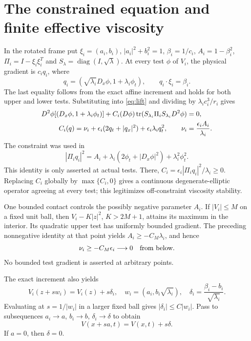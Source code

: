 \section{The constrained equation and finite effective viscosity}

In the rotated frame put $\xi_i=(a_i,b_i)$,
$|a_i|^2+b_i^2=1$, $\beta_i=1/c_i$, $A_i=1-\beta_i^2$,
$\Pi_i=I-\xi_i\xi_i^T$ and
$S_\lambda=\operatorname{diag}(I,\sqrt\lambda)$.
At every test $\phi$ of $V_i$, the physical gradient is $c_iq_i$,
where
\[
 q_i=(\sqrt{\lambda_i}D_x\phi,1+\lambda_i\phi_t),
 \qquad q_i\cdot\xi_i=\beta_i.
\]
The last equality follows from the exact affine increment and holds
for both upper and lower tests. Substituting into \eqref{eq:lift}
and dividing by $\lambda_ic_i^3/r_i$ gives
\begin{align}
 D^2\phi[(D_x\phi,1+\lambda_i\phi_t)]
   +C_i(D\phi)\operatorname{tr}(S_{\lambda_i}\Pi_iS_{\lambda_i}D^2\phi)&=0,
 \label{eq:scaled-pde}\\
 C_i(q)=\nu_i+\epsilon_i(2q_t+|q_x|^2)
                   +\epsilon_i\lambda_iq_t^2,\qquad
 \nu_i&=\frac{\epsilon_iA_i}{\lambda_i}.\nonumber
\end{align}
The constraint was used in
\[
 |\Pi_iq_i|^2=A_i+\lambda_i(2\phi_t+|D_x\phi|^2)
                              +\lambda_i^2\phi_t^2.
\]
This identity is only asserted at actual tests. There,
$C_i=\epsilon_i|\Pi_iq_i|^2/\lambda_i\geq0$. Replacing $C_i$
globally by $\max\{C_i,0\}$ gives a continuous degenerate-elliptic
operator agreeing at every test; this legitimizes off-constraint
viscosity stability.

One bounded contact controls the possibly negative parameter $A_i$.
If $|V_i|\leq M$ on a fixed unit ball, then
$V_i-K|z|^2$, $K>2M+1$, attains its maximum in the interior.
Its quadratic upper test has uniformly bounded gradient. The
preceding nonnegative identity at that point yields
$A_i\geq-C_M\lambda_i$, and hence
\begin{equation}\label{eq:nu-lower}
 \nu_i\geq-C_M\epsilon_i\longrightarrow0\quad\hbox{from below}.
\end{equation}
No bounded test gradient is asserted at arbitrary points.

The exact increment also yields
\[
 V_i(z+sw_i)=V_i(z)+s\delta_i,\quad
 w_i=(a_i,b_i\sqrt{\lambda_i}),\quad
 \delta_i=\frac{\beta_i-b_i}{\sqrt{\lambda_i}}.
\]
Evaluating at $s=1/|w_i|$ in a larger fixed ball gives
$|\delta_i|\leq C|w_i|$. Pass to subsequences
$a_i\to a$, $b_i\to b$, $\delta_i\to\delta$ to obtain
\begin{equation}\label{eq:transport}
 V(x+sa,t)=V(x,t)+s\delta.
\end{equation}
If $a=0$, then $\delta=0$.

